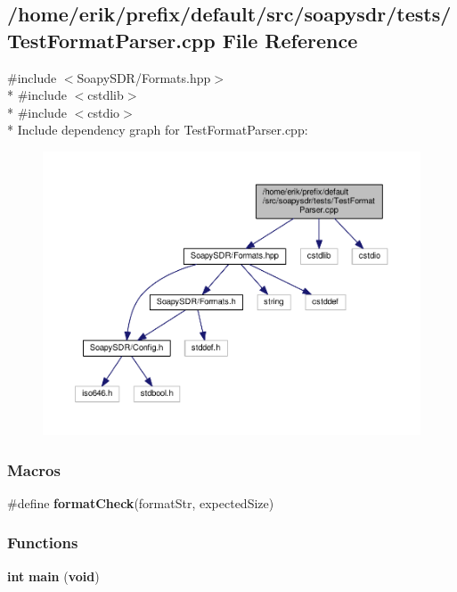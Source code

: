 \subsection{/home/erik/prefix/default/src/soapysdr/tests/\+Test\+Format\+Parser.cpp File Reference}
\label{TestFormatParser_8cpp}
{\ttfamily \#include $<$Soapy\+S\+D\+R/\+Formats.\+hpp$>$}\\*
{\ttfamily \#include $<$cstdlib$>$}\\*
{\ttfamily \#include $<$cstdio$>$}\\*
Include dependency graph for Test\+Format\+Parser.\+cpp\+:
\nopagebreak
\begin{figure}[H]
\begin{center}
\leavevmode
\includegraphics[width=350pt]{d9/d2a/TestFormatParser_8cpp__incl}
\end{center}
\end{figure}
\subsubsection*{Macros}
\begin{DoxyCompactItemize}
\item 
\#define {\bf format\+Check}(format\+Str,  expected\+Size)
\end{DoxyCompactItemize}
\subsubsection*{Functions}
\begin{DoxyCompactItemize}
\item 
{\bf int} {\bf main} ({\bf void})
\end{DoxyCompactItemize}



